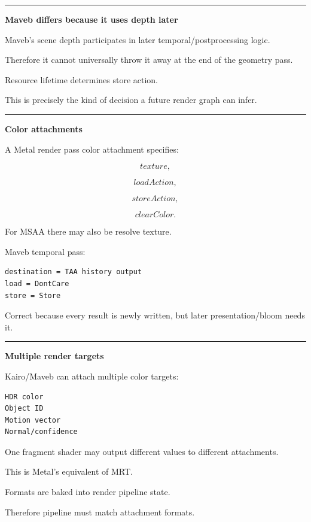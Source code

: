\begin{center}\rule{0.5\linewidth}{0.5pt}\end{center}

\textbf{Maveb differs because it uses depth later}

Maveb's scene depth participates in later temporal/postprocessing logic.

Therefore it cannot universally throw it away at the end of the geometry pass.

Resource lifetime determines store action.

This is precisely the kind of decision a future render graph can infer.

\begin{center}\rule{0.5\linewidth}{0.5pt}\end{center}

\textbf{Color attachments}

A Metal render pass color attachment specifies:

\[
texture,
\]

\[
loadAction,
\]

\[
storeAction,
\]

\[
clearColor.
\]

For MSAA there may also be resolve texture.

Maveb temporal pass:

\begin{verbatim}
destination = TAA history output
load = DontCare
store = Store
\end{verbatim}

Correct because every result is newly written, but later presentation/bloom needs it.

\begin{center}\rule{0.5\linewidth}{0.5pt}\end{center}

\textbf{Multiple render targets}

Kairo/Maveb can attach multiple color targets:

\begin{verbatim}
HDR color
Object ID
Motion vector
Normal/confidence
\end{verbatim}

One fragment shader may output different values to different attachments.

This is Metal's equivalent of MRT.

Formats are baked into render pipeline state.

Therefore pipeline must match attachment formats.

